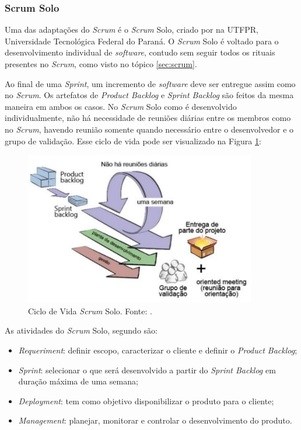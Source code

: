 \subsubsection{Scrum Solo}

Uma das adaptações do \textit{Scrum} é o \textit{Scrum} Solo, criado por  na UTFPR, Universidade Tecnológica Federal do Paraná. O \textit{Scrum} Solo é voltado para o desenvolvimento individual de \textit{software}, contudo sem seguir todos os rituais presentes no \textit{Scrum}, como visto no tópico \ref{sec:scrum}.

Ao final de uma \textit{Sprint}, um incremento de \textit{software} deve ser entregue assim como no \textit{Scrum}. Os artefatos de \textit{Product Backlog} e \textit{Sprint Backlog} são feitos da mesma maneira em ambos os casos. No \textit{Scrum} Solo como é desenvolvido individualmente, não há necessidade de reuniões diárias entre os membros como no \textit{Scrum}, havendo reunião somente quando necessário entre o desenvolvedor e o grupo de validação. Esse ciclo de vida pode ser visualizado na Figura \ref{img:ciclo_scrum_solo}:

\begin{figure}[H]
	\centering
	\includegraphics[width=0.9\textwidth]{figuras/fluxoScrumSolo.png}
	\caption{Ciclo de Vida \textit{Scrum} Solo. Fonte: .}
	\label{img:ciclo_scrum_solo}
\end{figure}

As atividades do \textit{Scrum} Solo, segundo  são:

\begin{itemize}
	\item \textit{Requeriment}: definir escopo, caracterizar o cliente e definir o \textit{Product Backlog}; 
	\item \textit{Sprint}: selecionar o que será desenvolvido a partir do \textit{Sprint Backlog} em duração máxima de uma semana;
	\item \textit{Deployment}: tem como objetivo disponibilizar o produto para o cliente;
	\item \textit{Management}: planejar, monitorar e controlar o desenvolvimento do produto.
\end{itemize}

